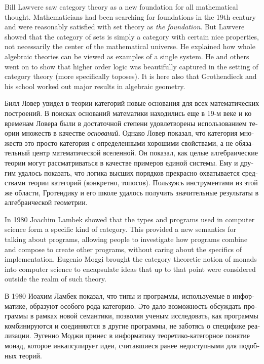 \documentclass[a4paper]{book}
\theoremstyle{myth}
\begin{document}
\begin{russian}
Bill Lawvere saw category theory as a new foundation for all mathematical thought. Mathematicians had been searching for foundations in the 19th century and were reasonably satisfied with set theory as {\em the foundation}. But Lawvere showed that the category of sets is simply a category with certain nice properties, not necessarily the center of the mathematical universe. He explained how whole algebraic theories can be viewed as examples of a single system. He and others went on to show that higher order logic was beautifully captured in the setting of category theory (more specifically toposes). It is here also that Grothendieck and his school worked out major results in algebraic geometry.

Билл Ловер увидел в теории категорий новые основания для всех математических построений. В поисках оснований математики находились еще в 19-м веке и ко временам Ловера были в достаточной степени удовлетворены использованием теории множеств в качестве {\em оснований}.%
 Однако Ловер показал, что категория множеств это просто категория с определенными хорошими свойствами, а не обязательный центр математической вселенной. Он показал, как целые алгебраические теории могут рассматриваться в качестве примеров единой системы. Ему и другим удалось показать, что логика высших порядков прекрасно охватывается средствами теории категорий (конкретно, топосов). Пользуясь инструментами из этой же области, Гротендику и его школе удалось получить значительные результаты в алгебраической геометрии. 

In 1980 Joachim Lambek showed that the types and programs used in computer science form a specific kind of category. This provided a new semantics for talking about programs, allowing people to investigate how programs combine and compose to create other programs, without caring about the specifics of implementation. Eugenio Moggi brought the category theoretic notion of monads into computer science to encapsulate ideas that up to that point were considered outside the realm of such theory.

В 1980 Иоахим Ламбек показал, что типы и программы, используемые в информатике, образуют особого рода категорию. Это дало возможность обсуждать программы в рамках новой семантики, позволяя ученым исследовать, как программы комбинируются и соединяются в другие программы, не заботясь о специфике реализации. Эугенио Моджи принес в информатику теоретико-категорное понятие монад, которое инкапсулирует идеи, считавшиеся ранее недоступными для подобных теорий. 


\end{russian}
\end{document}
